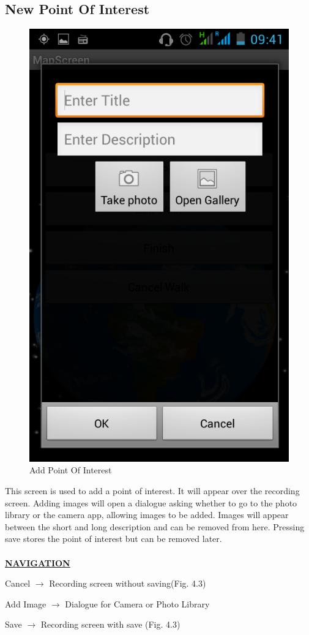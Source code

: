 \documentclass[12pt]{article}
\begin{document}
\subsection{New Point Of Interest}
\begin{figure}[htp]
\centering
\includegraphics[scale=0.4]{Project_Plan/android/add_poi.png}
\caption{Add Point Of Interest}
\label{Add Point Of Interest}
\end{figure}
\par{This screen is used to add a point of interest. It will appear over the recording screen. Adding images will open a dialogue asking whether to go to the photo library or the camera app, allowing images to be added. Images will appear between the short and long description and can be removed from here. Pressing save stores the point of interest but can be removed later. \\ \\}
\textbf{\uline{NAVIGATION}}
\par{Cancel $\rightarrow$ Recording screen without saving(Fig. 4.3)}
\par{Add Image $\rightarrow$ Dialogue for Camera or Photo Library}
\par{Save $\rightarrow$ Recording screen with save (Fig. 4.3)}
\end{document}
